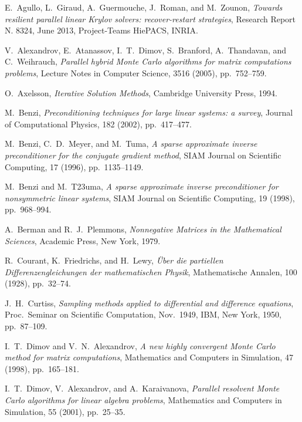 \documentclass[final,leqno,onefignum,onetabnum]{siamltex1213}
\begin{document}
\begin{thebibliography}{9}

  {\sc E.~Agullo, L.~Giraud, A.~Guermouche, J.~Roman, and M.~Zounon},
  {\em Towards resilient parallel linear Krylov solvers: recover-restart
  strategies},
  Research Report N. 8324, June 2013, Project-Teams HiePACS, INRIA.

 {\sc V.~Alexandrov, E.~Atanassov, I.~T.~Dimov, S.~Branford, A.~Thandavan, and
C.~Weihrauch},
{\em Parallel hybrid Monte Carlo algorithms for matrix computations
problems},
Lecture Notes in Computer Science,
3516 (2005), pp.~752--759.

 {\sc O.~Axelsson},
 {\em Iterative Solution Methods},
 Cambridge University Press, 1994.

 {\sc M.~Benzi},
 {\em Preconditioning techniques for large linear systems: a survey},
 Journal of Computational Physics,
 182 (2002), pp.~417--477.

 {\sc M.~Benzi, C.~D.~Meyer, and M.~Tuma},
 {\em A sparse approximate inverse preconditioner for the
 conjugate gradient method},
  SIAM Journal on Scientific Computing,
  17 (1996), pp.~1135--1149.

 {\sc M.~Benzi and M.~T\accent23uma},
 {\em A sparse approximate inverse preconditioner for nonsymmetric linear
systems},
  SIAM Journal on Scientific Computing,
  19 (1998), pp.~968--994.

{\sc A.~Berman and R.~J.~Plemmons},
{\em Nonnegative Matrices in the Mathematical Sciences},
Academic Press, New York, 1979.

{\sc R.~Courant, K.~Friedrichs, and H.~Lewy},
{\em \"Uber die partiellen Differenzengleichungen der mathematischen
Physik}, Mathematische Annalen, 100 (1928), pp.~32--74.

{\sc J.~H.~Curtiss},
{\em Sampling methods applied to differential and difference equations},
Proc.~Seminar on Scientific Computation, Nov.~1949, IBM, New York, 1950, pp.~87--109.

 {\sc I.~T.~Dimov and V.~N.~Alexandrov},
 {\em A new highly convergent Monte Carlo method for matrix computations},
 Mathematics and Computers in Simulation,
 47 (1998), pp.~165--181.

 {\sc I.~T.~Dimov, V.~Alexandrov, and A.~Karaivanova},
 {\em Parallel resolvent Monte Carlo algorithms for linear algebra
 problems},
 Mathematics and Computers in Simulation,
 55 (2001), pp.~25--35.


\end{thebibliography}
\end{document}
